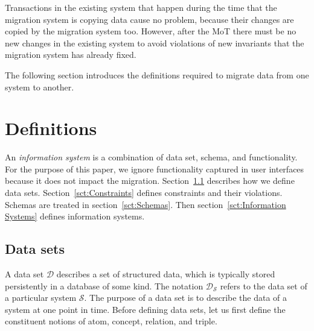 \documentclass[runningheads]{llncs}
\newcommand{\dataset}{\mathscr{D}}
\newcommand{\infsys}{\mathscr{S}}
\begin{document}
   Transactions in the existing system that happen during the time that the migration system is copying data cause no problem,
   because their changes are copied by the migration system too.
   However, after the MoT there must be no new changes in the existing system
   to avoid violations of new invariants that the migration system has already fixed.

   The following section introduces the definitions required to migrate data from one system to another.

\section{Definitions}
\label{sct:Definitions}
   An {\em information system} is a combination of data set, schema, and functionality.
   For the purpose of this paper, we ignore functionality captured in user interfaces because it does not impact the migration.
   Section~\ref{sct:Data sets} describes how we define data sets.
   Section~\ref{sct:Constraints} defines constraints and their violations.
   Schemas are treated in section~\ref{sct:Schemas}.
   Then section~\ref{sct:Information Systems} defines information systems.

\subsection{Data sets}
\label{sct:Data sets}
   A data set $\dataset$ describes a set of structured data, which is typically stored persistently in a database of some kind.
   The notation $\dataset_{\infsys}$ refers to the data set of a particular system $\infsys$.
   The purpose of a data set is to describe the data of a system at one point in time. 
   Before defining data sets, let us first define the constituent notions of atom, concept, relation, and triple.
   
\end{document}
